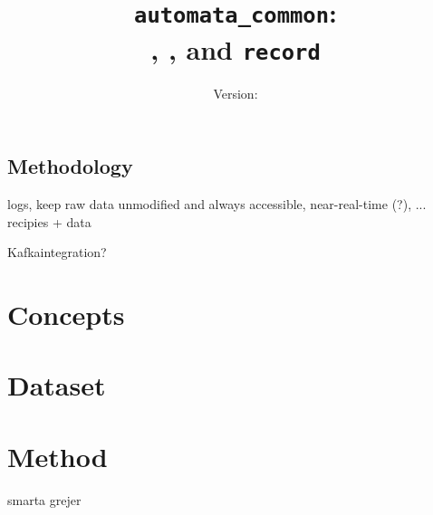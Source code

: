 \documentclass[a4paper]{report}
\title{\texttt{automata\_common}:\\ \jobtuple, \joblist, and \texttt{record}}
\author{Version: \inputfile{gitrevision}}
\date{}
\begin{document}




%


\section{Methodology}
logs, keep raw data unmodified and always accessible, near-real-time (?), ...
recipies + data

Kafkaintegration?

\chapter{Concepts}


\chapter{Dataset}


\chapter{Method}


%

%
%




%


%


smarta grejer



\end{document}
